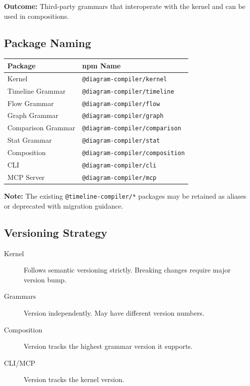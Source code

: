 \textbf{Outcome:} Third-party grammars that interoperate with the kernel and can be used in compositions.

\subsection{Package Naming}

\begin{center}
\small
\begin{tabular}{ll}
\toprule
\textbf{Package} & \textbf{npm Name} \\
\midrule
Kernel & \texttt{@diagram-compiler/kernel} \\
Timeline Grammar & \texttt{@diagram-compiler/timeline} \\
Flow Grammar & \texttt{@diagram-compiler/flow} \\
Graph Grammar & \texttt{@diagram-compiler/graph} \\
Comparison Grammar & \texttt{@diagram-compiler/comparison} \\
Stat Grammar & \texttt{@diagram-compiler/stat} \\
Composition & \texttt{@diagram-compiler/composition} \\
CLI & \texttt{@diagram-compiler/cli} \\
MCP Server & \texttt{@diagram-compiler/mcp} \\
\bottomrule
\end{tabular}
\end{center}

\textbf{Note:} The existing \texttt{@timeline-compiler/*} packages may be retained as aliases or deprecated with migration guidance.

\subsection{Versioning Strategy}

\begin{description}
  \item[Kernel] Follows semantic versioning strictly. Breaking changes require major version bump.
  
  \item[Grammars] Version independently. May have different version numbers.
  
  \item[Composition] Version tracks the highest grammar version it supports.
  
  \item[CLI/MCP] Version tracks the kernel version.
\end{description}

